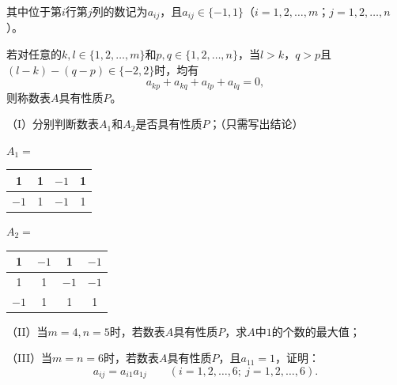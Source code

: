 其中位于第$i$行第$j$列的数记为$a_{ij}$，且$a_{ij}\in\{-1,1\}$（$i=1,2,\ldots,m$；$j=1,2,\ldots,n$）。

若对任意的$k,l\in\{1,2,\ldots,m\}$和$p,q\in\{1,2,\ldots,n\}$，当$l>k$，$q>p$且$(l-k)-(q-p)\in\{-2,2\}$时，均有
\[
a_{kp}+a_{kq}+a_{lp}+a_{lq}=0,
\]
则称数表$A$具有性质$P$。

\noindent（I）分别判断数表$A_1$和$A_2$是否具有性质$P$；（只需写出结论）

\begin{center}
$A_1=$\,
\begin{tabular}{|c|c|c|c|}
\hline 1&1&$-1$&1\\ \hline
$-1$&1&$-1$&1\\ \hline
\end{tabular}
\qquad\qquad
$A_2=$\,
\begin{tabular}{|c|c|c|c|}
\hline 1&$-1$&1&$-1$\\ \hline
1&1&$-1$&$-1$\\ \hline
$-1$&1&1&1\\ \hline
\end{tabular}
\end{center}

\noindent（II）当$m=4,n=5$时，若数表$A$具有性质$P$，求$A$中$1$的个数的最大值；

\noindent（III）当$m=n=6$时，若数表$A$具有性质$P$，且$a_{11}=1$，证明：
\[
a_{ij}=a_{i1}a_{1j}\qquad(i=1,2,\ldots,6;\ j=1,2,\ldots,6).
\]

